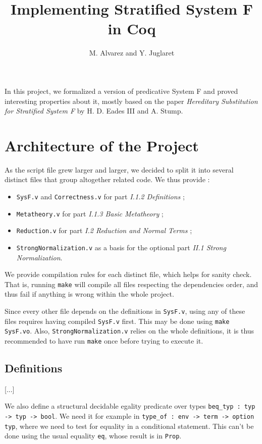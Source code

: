 \documentclass[a4paper,11pt]{article}
\begin{document}
\title{Implementing Stratified System F in Coq}
\author{M. Alvarez and Y. Juglaret}
\date{}
\maketitle

In this project, we formalized a version of predicative System F and
proved interesting properties about it, mostly based on the paper
\emph{Hereditary Substitution for Stratified System F} by H. D. Eades
III and A. Stump.

\section{Architecture of the Project}

As the script file grew larger and larger, we decided to split it into
several distinct files that group altogether related code. We thus
provide :

\begin{itemize}
  \item \verb|SysF.v| and \verb|Correctness.v| for part \emph{I.1.2
    Definitions} ;
  \item \verb|Metatheory.v| for part \emph{I.1.3 Basic Metatheory} ;
  \item \verb|Reduction.v| for part \emph{I.2 Reduction and Normal
    Terms} ;
  \item \verb|StrongNormalization.v| as a basis for the optional
    part \emph{II.1 Strong Normalization}.
\end{itemize}

We provide compilation rules for each distinct file, which helps
for sanity check. That is, running \verb|make| will compile all files
respecting the dependencies order, and thus fail if anything is wrong
within the whole project.

Since every other file depends on the definitions in \verb|SysF.v|,
using any of these files requires having compiled \verb|SysF.v|
first. This may be done using \verb|make SysF.vo|. Also,
\verb|StrongNormalization.v| relies on the whole definitions, it is
thus recommended to have run \verb|make| once before trying to execute
it.

\subsection{Definitions}

[...]

We also define a structural decidable egality predicate over types
\verb|beq_typ : typ -> typ -> bool|. We need it for example in
\verb|type_of : env -> term -> option typ|, where we need to test for
equality in a conditional statement. This can't be done using
the usual equality \verb|eq|, whose result is in \verb|Prop|.
\end{document}
